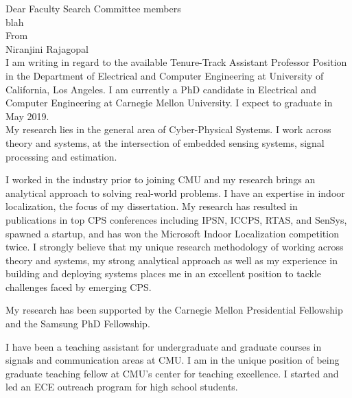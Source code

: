 \documentclass[10pt]{article}
\date{}
\begin{document}




Dear Faculty Search Committee members\\
blah\\

From\\
Niranjini Rajagopal\\


I am writing in regard to the available Tenure-Track Assistant Professor Position in the Department of Electrical and Computer Engineering at University of California, Los Angeles. I am currently a PhD candidate in Electrical and Computer Engineering at Carnegie Mellon University. I expect to graduate in May 2019. \\

My research lies in the general area of Cyber-Physical Systems. I work across theory and systems, at the intersection of embedded sensing systems, signal processing and estimation. 


I worked in the industry prior to joining CMU and my research brings an analytical approach to solving real-world problems. I have an expertise in indoor localization, the focus of my dissertation. My research has resulted in publications in top CPS conferences including IPSN, ICCPS, RTAS, and SenSys, spawned a startup, and has won the Microsoft Indoor Localization competition twice. I strongly believe that my unique research methodology of working across theory and systems, my strong analytical approach as well as my experience in building and deploying systems places me in an excellent position to tackle challenges faced by emerging CPS. 

My research has been supported by the Carnegie Mellon Presidential Fellowship and the Samsung PhD Fellowship. 

I have been a teaching assistant for undergraduate and graduate courses in signals and communication areas at CMU. I am in the unique position of being  graduate teaching fellow at CMU's center for teaching excellence. I started and led an ECE outreach program for high school students. 
\end{document}
